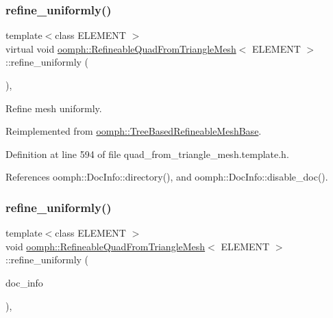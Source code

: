 \subsubsection{\texorpdfstring{refine\+\_\+uniformly()}{refine\_uniformly()}\hspace{0.1cm}{\footnotesize\ttfamily [1/2]}}
{\footnotesize\ttfamily template$<$class E\+L\+E\+M\+E\+NT $>$ \\
virtual void \hyperlink{classoomph_1_1RefineableQuadFromTriangleMesh}{oomph\+::\+Refineable\+Quad\+From\+Triangle\+Mesh}$<$ E\+L\+E\+M\+E\+NT $>$\+::refine\+\_\+uniformly (\begin{DoxyParamCaption}{ }\end{DoxyParamCaption})\hspace{0.3cm}{\ttfamily [inline]}, {\ttfamily [virtual]}}



Refine mesh uniformly. 



Reimplemented from \hyperlink{classoomph_1_1TreeBasedRefineableMeshBase_a8e67b50fecb03fe1ac93dcb81e4ac6e9}{oomph\+::\+Tree\+Based\+Refineable\+Mesh\+Base}.



Definition at line 594 of file quad\+\_\+from\+\_\+triangle\+\_\+mesh.\+template.\+h.



References oomph\+::\+Doc\+Info\+::directory(), and oomph\+::\+Doc\+Info\+::disable\+\_\+doc().

\mbox{\label{classoomph_1_1RefineableQuadFromTriangleMesh_ab78f50c13f9ccf7d1f359bc443fe2a9d}} 
\subsubsection{\texorpdfstring{refine\+\_\+uniformly()}{refine\_uniformly()}\hspace{0.1cm}{\footnotesize\ttfamily [2/2]}}
{\footnotesize\ttfamily template$<$class E\+L\+E\+M\+E\+NT $>$ \\
void \hyperlink{classoomph_1_1RefineableQuadFromTriangleMesh}{oomph\+::\+Refineable\+Quad\+From\+Triangle\+Mesh}$<$ E\+L\+E\+M\+E\+NT $>$\+::refine\+\_\+uniformly (\begin{DoxyParamCaption}\item[{\hyperlink{classoomph_1_1DocInfo}{Doc\+Info} \&}]{doc\+\_\+info }\end{DoxyParamCaption})\hspace{0.3cm}{\ttfamily [inline]}, {\ttfamily [virtual]}}



